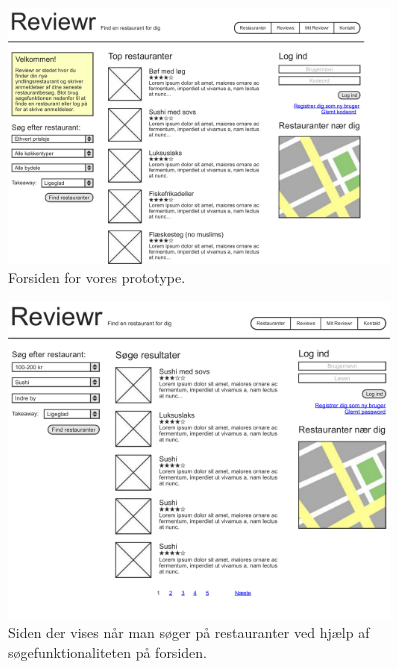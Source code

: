 \documentclass[a4paper, 12pt]{article}
\begin{document}
\begin{figure}[hp]
  \centering
  \includegraphics[width=0.9\textwidth]{mockup/page1.pdf}
  \caption{Forsiden for vores prototype.}
\end{figure}

\begin{figure}[hp]
  \centering
  \includegraphics[width=0.9\textwidth]{mockup/page2.pdf}
  \caption{Siden der vises når man søger på restauranter ved hjælp af
    søgefunktionaliteten på forsiden.}
\end{figure}
\end{document}
